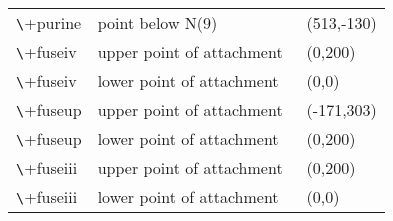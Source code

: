 \begin{minipage}{11cm}
\begin{tabular}{|l|l|l|}
  \verb+\+purine    & point below N(9)          & \ (513,-130)\\[-2mm]
  \verb+\+fuseiv    & upper point of attachment & \ (0,200)   \\[-2mm]
  \verb+\+fuseiv    & lower point of attachment & \ (0,0)     \\[-2mm]
  \verb+\+fuseup    & upper point of attachment & \ (-171,303)\\[-2mm]
  \verb+\+fuseup    & lower point of attachment & \ (0,200)   \\[-2mm]
  \verb+\+fuseiii   & upper point of attachment & \ (0,200)   \\[-2mm]
  \verb+\+fuseiii   & lower point of attachment & \ (0,0) \\
  \hline
  \end{tabular}
  \end{minipage}

 
